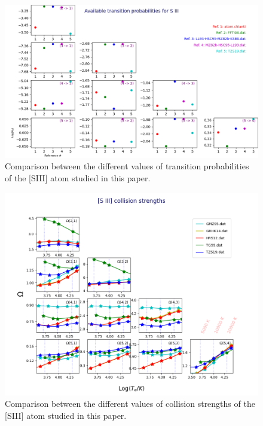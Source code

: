 \documentclass[fleqn,usenatbib]{mnras}
\begin{document}
\begin{figure}
\includegraphics[width=\textwidth]{A_siii.png}
\caption{Comparison between the different values of transition probabilities of the [S\thinspace III] atom studied in this paper.}
\label{fig:A_sii}
\end{figure}

\begin{figure}
\includegraphics[width=\textwidth]{omega_siii_zoom.png}
\caption{Comparison between the different values of collision strengths of the [S\thinspace III] atom studied in this paper.}
\label{fig:omega_siii_zoom }
\end{figure}
\end{document}
